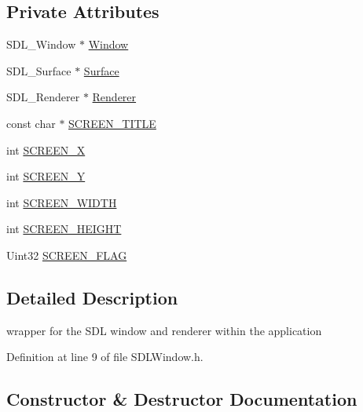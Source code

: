 \subsection*{Private Attributes}
\begin{DoxyCompactItemize}
\item 
S\+D\+L\+\_\+\+Window $\ast$ \hyperlink{class_s_d_l_window_aa95576b14f59ec62a9e7f6fb8c2f79cc}{Window}
\item 
S\+D\+L\+\_\+\+Surface $\ast$ \hyperlink{class_s_d_l_window_a7e7b7186d315e3294fb1761e1eb284ae}{Surface}
\item 
S\+D\+L\+\_\+\+Renderer $\ast$ \hyperlink{class_s_d_l_window_ae679402fd05b8eb3fd8680f1f036aaca}{Renderer}
\item 
const char $\ast$ \hyperlink{class_s_d_l_window_afeb1a7d48dde026d437babea6667ebee}{S\+C\+R\+E\+E\+N\+\_\+\+T\+I\+T\+LE}
\item 
int \hyperlink{class_s_d_l_window_ade54e8777a5e5017b139b4559c791634}{S\+C\+R\+E\+E\+N\+\_\+X}
\item 
int \hyperlink{class_s_d_l_window_abdb8d6136e9724e854c491cb9eef054d}{S\+C\+R\+E\+E\+N\+\_\+Y}
\item 
int \hyperlink{class_s_d_l_window_ab3faec77de829876613ea52176ef61e1}{S\+C\+R\+E\+E\+N\+\_\+\+W\+I\+D\+TH}
\item 
int \hyperlink{class_s_d_l_window_aed36cc4e541ecf78cda7e92f99a84d71}{S\+C\+R\+E\+E\+N\+\_\+\+H\+E\+I\+G\+HT}
\item 
Uint32 \hyperlink{class_s_d_l_window_a52d0a3b9ea7107e63476b24bc8a43397}{S\+C\+R\+E\+E\+N\+\_\+\+F\+L\+AG}
\end{DoxyCompactItemize}


\subsection{Detailed Description}
wrapper for the S\+DL window and renderer within the application 

Definition at line 9 of file S\+D\+L\+Window.\+h.



\subsection{Constructor \& Destructor Documentation}
\mbox{\label{class_s_d_l_window_ab081329db76eaeaed1716c2e3bad50b2}} 

